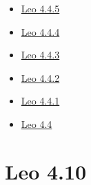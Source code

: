 \documentclass[a4paper,10pt,english]{sphinxmanual}
\begin{document}
{\begin{minipage}{0.95\linewidth}
\begin{itemize}
\begin{itemize}
\begin{itemize}
\item {} 
{\hyperref[what-is-new:leo-4-4-5]{Leo 4.4.5}}

\item {} 
{\hyperref[what-is-new:leo-4-4-4]{Leo 4.4.4}}

\item {} 
{\hyperref[what-is-new:leo-4-4-3]{Leo 4.4.3}}

\item {} 
{\hyperref[what-is-new:leo-4-4-2]{Leo 4.4.2}}

\item {} 
{\hyperref[what-is-new:leo-4-4-1]{Leo 4.4.1}}

\item {} 
{\hyperref[what-is-new:leo-4-4]{Leo 4.4}}

\end{itemize}

\end{itemize}

\end{itemize}
\end{minipage}}
\begin{center}\setlength{\fboxsep}{5pt}\end{center}


\section{Leo 4.10}
\label{what-is-new:leo-and-emacs}\label{what-is-new:leo-4-10}
\end{document}
